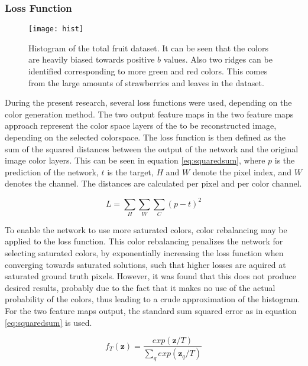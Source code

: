 \subsubsection{Loss Function}

\begin{wrapfigure}{R}{0.5\textwidth}
	\vspace{-20pt}
	\begin{center}
		\texttt{[image: hist]}
	\end{center}
	\caption{Histogram of the total fruit dataset. It can be seen that the colors are heavily biased towards positive $b$ values. Also two ridges can be identified corresponding to more green and red colors. This comes from the large amounts of strawberries and leaves in the dataset.}
	\label{fig:histogram}
	\vspace{5pt}
\end{wrapfigure}

During the present research, several loss functions were used, depending on the color generation method.
The two output feature maps in the two feature maps approach represent the color space layers of the to be reconstructed image, depending on the selected colorspace. The loss function is then defined as the sum of the squared distances between the output of the network and the original image color layers. This can be seen in equation \ref{eq:squaredsum}, where $p$ is the prediction of the network, $t$ is the target, $H$ and $W$ denote the pixel index, and $W$ denotes the channel. The distances are calculated per pixel and per color channel.


\begin{equation}
\label{eq:squaredsum}
L = \sum_{H}\sum_{W} \sum_{C}(p - t)^2
\end{equation}

To enable the network to use more saturated colors, color rebalancing may be applied to the loss function. This color rebalancing penalizes the network for selecting saturated colors, by exponentially increasing the loss function when converging towards saturated solutions, such that higher losses are aquired at saturated ground truth pixels. However, it was found that this does not produce desired results, probably due to the fact that it makes no use of the actual probability of the colors, thus leading to a crude approximation of the histogram. For the two feature maps output, the standard sum squared error as in equation \ref{eq:squaredsum} is used.

\begin{equation}
f_{T}(\textbf{z})=\frac{exp(\textbf{z}/T)}{\sum_q^{}exp(\textbf{z}_{q}/T)}
\label{eq:anmean}
\end{equation}

